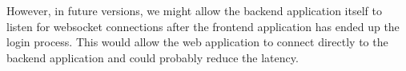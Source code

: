 However, in future versions, we might allow the backend application itself to listen for 
websocket connections after the frontend application has ended up the login process. 
This would allow the web application to connect directly to the backend application 
and could probably reduce the latency.
